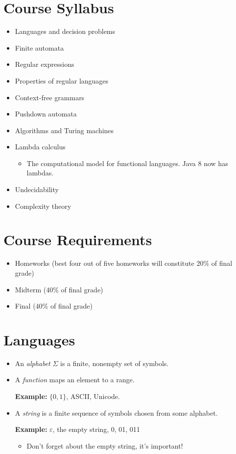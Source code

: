 \documentclass[]{article}
\begin{document}
\section{Course Syllabus}
  \begin{itemize}
    \item Languages and decision problems
    \item Finite automata
    \item Regular expressions
    \item Properties of regular languages
    \item Context-free grammars
    \item Pushdown automata
    \item Algorithms and Turing machines
    \item Lambda calculus
      \begin{itemize}
        \item The computational model for functional languages. Java 8 now has 
        lambdas.
      \end{itemize}
    \item Undecidability
    \item Complexity theory
  \end{itemize}

\section{Course Requirements}
  \begin{itemize}
    \item Homeworks (best four out of five homeworks will constitute 20\% of 
    final grade)
    \item Midterm (40\% of final grade)
    \item Final (40\% of final grade)
  \end{itemize}

\section{Languages}
  \begin{itemize}
    \item An \emph{alphabet} $\Sigma$ is a finite, nonempty set of symbols.
    \item A \emph{function} maps an element to a range.
    \item[\textbf{Example:}]
    $\{0, 1\}$, ASCII, Unicode. 
    \item A \emph{string} is a finite sequence of symbols chosen from some 
    alphabet.
    \item[\textbf{Example:}] $\varepsilon$, the empty string, 0, 01, 011
    \begin{itemize}
      \item Don't forget about the empty string, it's important!
    \end{itemize}
  \end{itemize}
\end{document}

